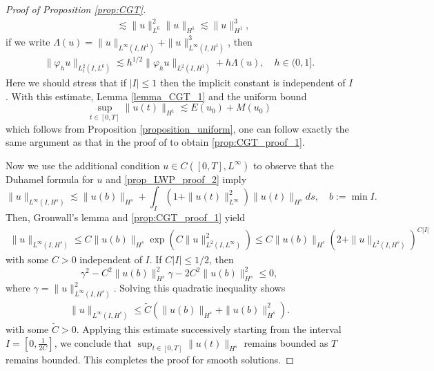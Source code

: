 \documentclass[10pt%
]{amsart}
\numberwithin{equation}{section}
\theoremstyle{definition}
\begin{document}
\begin{proof}[Proof of Proposition \ref{prop:CGT}]
\begin{align*}
		&\lesssim \|u\|_{L^6}^2\|u\|_{H^1}\lesssim \|u\|_{H^1}^3,
	\end{align*}
	if we write $\Lambda(u)=\|u\|_{L^\infty(I,H^1)}+\|u\|_{L^\infty(I,H^1)}^3$, then
	\begin{align}
		\label{refine-strichartz}
		\|\varphi_hu\|_{L_t^2(I,L^6)}\lesssim h^{1/2}\|\varphi_hu\|_{L^2(I,H^1)}+h\Lambda(u),\quad h\in (0,1].
	\end{align}
	Here we should stress that if $|I|\le1$ then the implicit constant is independent of $I$. With this estimate, Lemma \ref{lemma_CGT_1} and the uniform bound
	$$
	\sup_{t\in [0,T]}\|u(t)\|_{H^1}\lesssim E(u_0)+M(u_0)
	$$
	which follows from Proposition \ref{proposition_uniform}, one can follow exactly the same argument as that in the proof of \cite[Thoerem 3]{BGT} to obtain \eqref{prop:CGT_proof_1}. 
	
	Now we use the additional condition $u\in C([0,T],L^\infty)$ to observe that the Duhamel formula for $u$ and \eqref{prop_LWP_proof_2} imply
	$$
	\|u\|_{L^\infty(I,H^s)}\lesssim \|u(b)\|_{H^s}+\int_I(1+\|u(t)\|_{L^\infty}^2)\|u(t)\|_{H^s}ds,\quad  b:=\min I.
	$$
	Then, Gronwall's lemma and \eqref{prop:CGT_proof_1} yield
	\begin{align*}
		\|u\|_{L^\infty(I,H^s)}
		\le C\|u(b)\|_{H^s}\exp(C\|u\|_{L^2(I,L^\infty)}^2)
		\le C\|u(b)\|_{H^s}(2+\|u\|_{L^2(I,H^s)})^{C|I|}
	\end{align*}
	with some $C>0$ independent of $I$. If $C|I|\le1/2$, then 
	$$\gamma^2-C^2\|u(b)\|_{H^s}^2\gamma -2C^2\|u(b)\|_{H^s}^2\le0,$$
	where $\gamma=\|u\|_{L^\infty(I,H^s)}^2$. Solving this quadratic inequality shows
	\begin{align*}
		\|u\|_{L^\infty(I,H^s)}\le \tilde C (\|u(b)\|_{H^s}+\|u(b)\|_{H^s}^2).
	\end{align*}
	with some $\tilde C>0$. Applying this estimate successively starting from the interval $I=[0,\frac{1}{2C}]$, we conclude that $\sup_{t\in [0,T]}\|u(t)\|_{H^s}
	$ remains bounded as $T$ remains bounded. This completes the proof for smooth solutions. 
	
	

\end{proof}
\end{document}
